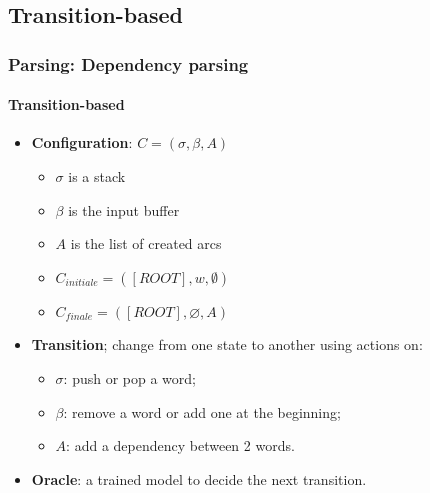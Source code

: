 \documentclass[xcolor=table]{beamer}
\begin{document}
\subsection{Transition-based}

\begin{frame}
\frametitle{Parsing: Dependency parsing}
\framesubtitle{Transition-based}

\begin{minipage}{.6\textwidth}
	\begin{itemize}
		\item \textbf{Configuration}:  $C = (\sigma, \beta, A)$
		\begin{itemize}
			\item $\sigma$ is a stack
			\item $\beta$ is the input buffer
			\item $A$ is the list of created arcs
			\item $C_{initiale} = ([ROOT], w, \emptyset)$
			\item $C_{finale} = ([ROOT], \varnothing, A)$
		\end{itemize}
	\end{itemize}
\end{minipage}
\begin{minipage}{.38\textwidth}
\end{minipage}

\begin{itemize}
	\item \textbf{Transition}; change from one state to another using actions on:
	\begin{itemize}
		\item $\sigma$: push or pop a word;
		\item $\beta$: remove a word or add one at the beginning;
		\item $A$: add a dependency between 2 words.
	\end{itemize}
	\item \textbf{Oracle}: a trained model to decide the next transition.
\end{itemize}

\end{frame}
\end{document}
